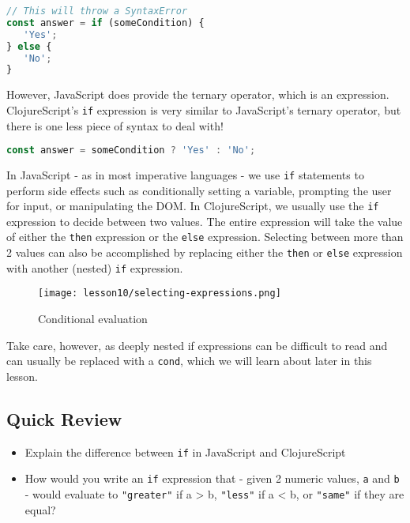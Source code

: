 \documentclass[10pt,twoside,openright]{memoir}
\begin{document}
\begin{lstlisting}[language=JavaScript, caption={JavaScript ifs are not expressions}]
// This will throw a SyntaxError
const answer = if (someCondition) {
   'Yes';
} else {
   'No';
}
\end{lstlisting}

However, JavaScript does provide the ternary operator, which is an
expression. ClojureScript's \texttt{if} expression is very similar to
JavaScript's ternary operator, but there is one less piece of syntax to
deal with!

\begin{lstlisting}[language=JavaScript, caption={\ldots{}but ternaries are}]
const answer = someCondition ? 'Yes' : 'No';
\end{lstlisting}

In JavaScript - as in most imperative languages - we use \texttt{if}
statements to perform side effects such as conditionally setting a
variable, prompting the user for input, or manipulating the DOM. In
ClojureScript, we usually use the \texttt{if} expression to decide
between two values. The entire expression will take the value of either
the \texttt{then} expression or the \texttt{else} expression. Selecting
between more than 2 values can also be accomplished by replacing either
the \texttt{then} or \texttt{else} expression with another (nested)
\texttt{if} expression.

\begin{figure}[H]
\caption{Conditional evaluation}
\centering
\texttt{[image: lesson10/selecting-expressions.png]}
\end{figure}

Take care, however, as deeply nested if expressions can be difficult to
read and can usually be replaced with a \texttt{cond}, which we will
learn about later in this lesson.

\subsection{Quick Review}

\begin{itemize}
\tightlist
\item
  Explain the difference between \texttt{if} in JavaScript and
  ClojureScript
\item
  How would you write an \texttt{if} expression that - given 2 numeric
  values, \texttt{a} and \texttt{b} - would evaluate to
  \texttt{"greater"} if a \textgreater{} b, \texttt{"less"} if a
  \textless{} b, or \texttt{"same"} if they are equal?
\end{itemize}
\end{document}
